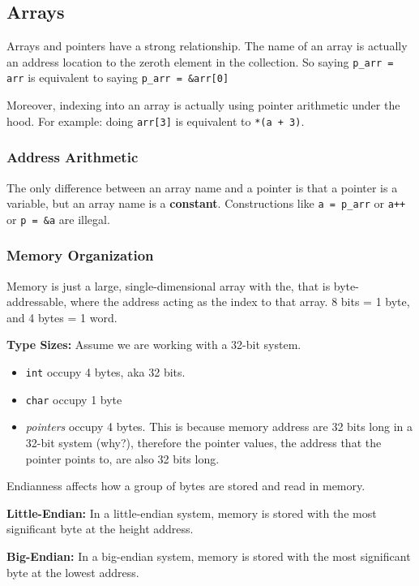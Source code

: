 \documentclass[12pt]{article}
\begin{document}
\subsection*{Arrays}
Arrays and pointers have a strong relationship. The name of an array is actually an address location to the zeroth element in the collection. \newline
So saying \lstinline{p_arr = arr} is equivalent to saying \lstinline{p_arr = &arr[0]}

Moreover, indexing into an array is actually using pointer arithmetic under the hood. For example: doing \lstinline{arr[3]} is equivalent to \lstinline{*(a + 3)}.

\subsubsection*{Address Arithmetic}
The only difference between an array name and a pointer is that a pointer is a variable, but an array name is a \textbf{constant}. Constructions like \lstinline{a = p_arr} or \lstinline{a++} or \lstinline{p = &a} are illegal.


\subsubsection*{Memory Organization}
Memory is just a large, single-dimensional array with the, that is byte-addressable, where the address acting as the index to that array. 8 bits = 1 byte, and 4 bytes = 1 word.



\textbf{Type Sizes:} Assume we are working with a 32-bit system.
\begin{itemize}
    \item \lstinline{int} occupy 4 bytes, aka 32 bits.
    \item \lstinline{char} occupy 1 byte
    \item \emph{pointers} occupy 4 bytes. This is because memory address are 32 bits long in a 32-bit system (why?), therefore the pointer values, the address that the pointer points to, are also 32 bits long.
\end{itemize}
\begin{definition}
    Endianness affects how a group of bytes are stored and read in memory.

    \textbf{Little-Endian:} In a little-endian system, memory is stored with the most significant byte at the height address.

    \textbf{Big-Endian:} In a big-endian system, memory is stored with the most significant byte at the lowest address.
\end{definition}
\end{document}
